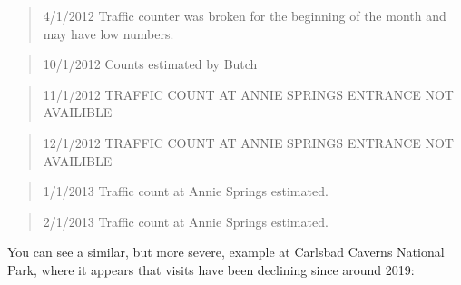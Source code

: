 \documentclass[
  letterpaper,
  DIV=11,
  numbers=noendperiod]{scrartcl}
\begin{document}
\begin{quote}
4/1/2012 \textbar{} Traffic counter was broken for the beginning of the
month and may have low numbers.
\end{quote}

\begin{quote}
10/1/2012 \textbar{} Counts estimated by Butch
\end{quote}

\begin{quote}
11/1/2012 \textbar{} TRAFFIC COUNT AT ANNIE SPRINGS ENTRANCE NOT
AVAILIBLE
\end{quote}

\begin{quote}
12/1/2012 \textbar{} TRAFFIC COUNT AT ANNIE SPRINGS ENTRANCE NOT
AVAILIBLE
\end{quote}

\begin{quote}
1/1/2013 \textbar{} Traffic count at Annie Springs estimated.
\end{quote}

\begin{quote}
2/1/2013 \textbar{} Traffic count at Annie Springs estimated.
\end{quote}

You can see a similar, but more severe, example at Carlsbad Caverns
National Park, where it appears that visits have been declining since
around 2019:
\end{document}
